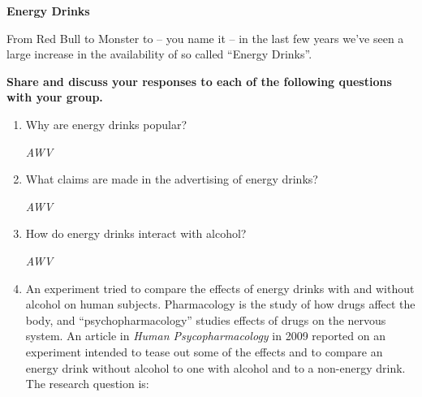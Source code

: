 \def\theTopic{Energy Drinks }
\def\dayNum{14}

\begin{center}
{\bf {\large Energy Drinks}}
\end{center}
\vspace{-.1in}

From Red Bull to Monster to -- you name it -- in the last few years
we've seen a large increase in the availability of so called ``Energy
Drinks''. 

{\bf Share and discuss your responses to each of the following
  questions with your group. }
\begin{enumerate}
  \item  Why are energy drinks popular? 
\begin{students}
    \vspace{4cm}    
\end{students}

\begin{key}
  {\it  AWV}
\end{key}

  \item  What claims are made in the advertising of energy drinks?
\begin{students}
     \vspace{5cm}    
\end{students}

\begin{key}
  {\it  AWV }
\end{key}

  \item  How do energy drinks interact with alcohol?
\begin{students}
    \vspace{5cm}    
\end{students}

\begin{key}
  {\it  AWV}
\end{key}

\item An experiment tried to compare the effects of energy drinks with
  and without alcohol on human subjects.  Pharmacology is the study of
  how drugs affect the body, and ``psychopharmacology'' studies
  effects of drugs on the nervous system. An article in {\it Human
    Psycopharmacology} in 2009 reported on an experiment intended to
  tease out some of the effects and to compare an energy drink without
  alcohol to one with alcohol and to a non-energy drink.  The research
  question is:


\end{enumerate}
